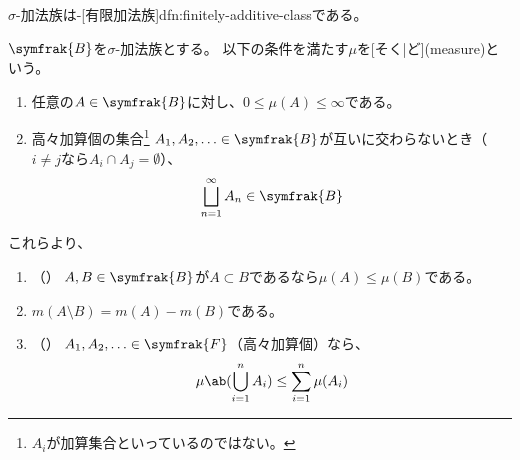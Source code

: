 \documentclass[../sotsu.tex]{subfiles}
\begin{document}
$\sigma$-加法族は-[有限加法族]{dfn:finitely-additive-class}である。



\begin{definition}
    $\symfrak{B}$を$\sigma$-加法族とする。
    以下の条件を満たす$\mu$を[そく|ど](measure)という。
    \begin{enumerate}
        \item 任意の$A \in \symfrak{B}$に対し、$0 \leq \mu(A) \leq \infty$である。
        \item 高々加算個の集合\footnote{$A_i$が加算集合といっているのではない。}%
            $A_1, A_2, \dotsc \in \symfrak{B}$が互いに交わらないとき（$i \neq j$なら$A_i \cap A_j = \emptyset$）、
            \[  \bigsqcup_{n=1}^{\infty} A_n  \in  \symfrak{B}  \]
    \end{enumerate}
    これらより、
    \begin{enumerate}[resume]
        \item \label{content-measure:monotonicity}（）
            $A, B \in \symfrak{B}$が$A \subset B$であるなら$\mu(A) \leq \mu(B)$である。
        \item $m(A \setminus B) = m(A) - m(B)$である。
        \item \label{content-measure:subadditivity}（）
            $A_1, A_2, \dotsc \in \symfrak{F}$（高々加算個）なら、
            \begin{equation*}
                \mu \ab( \bigcup_{i=1}^{n} A_i ) \leq \sum_{i=1}^{n} \mu(A_i)
            \end{equation*}
    \end{enumerate}
\end{definition}
\end{document}
